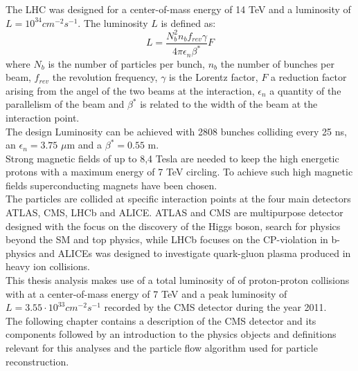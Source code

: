 The LHC was designed for a center-of-mass energy of 14 TeV and a luminosity of $L = 10^{34} cm^{-2}s^{-1}$. The luminosity $L$ is defined as:
\begin{equation}
 L = \frac{N^{2}_{b}n_{b}f_{rev}\gamma}{4\pi \epsilon_{n}\beta^*}F
\end{equation}
where $N_{b}$ is the number of particles per bunch, $n_b$ the number of bunches per beam, $f_{rev}$ the  revolution frequency, $\gamma$ is the Lorentz factor, $F$ a reduction factor arising from the angel of the two beams at the interaction, $\epsilon_n$ a quantity of the parallelism of the beam and $\beta^*$ is related to the width of the beam at the interaction point.\\
The design Luminosity can be achieved with 2808 bunches colliding every 25 ns, an $\epsilon_n=3.75$ $\mu\text{m}$ and a $\beta^* = 0.55$ m.\\ 
Strong magnetic fields of up to 8,4 Tesla are needed to keep the high energetic protons with a maximum energy of 7 TeV circling. To achieve such high magnetic fields superconducting magnets have been chosen.\\
The particles are collided at specific interaction points at the four main detectors ATLAS\cite{det::ATLAS}, CMS\cite{bib:cmsptdr1}, LHCb\cite{det::LHCb} and ALICE\cite{det::ALICE}.
ATLAS and CMS are multipurpose detector designed with the focus on the discovery of the Higgs boson, search for physics beyond the SM and top physics, while LHCb focuses on the CP-violation in b-physics and ALICEs was designed to investigate quark-gluon plasma produced in heavy ion collisions.\\
This thesis analysis makes use of a total luminosity of \lumi\cite{CMS-PAS-EWK-11-001__} of proton-proton collisions with at a center-of-mass energy of 7 TeV and a peak luminosity of $L = 3.55 \cdot 10^{33} cm^{-2}s^{-1}$ recorded by the CMS detector during the year 2011.\\
The following chapter contains a description of the CMS detector and its components followed by an introduction to the physics objects and definitions relevant for this analyses and the particle flow algorithm used for particle reconstruction.
\clearpage









